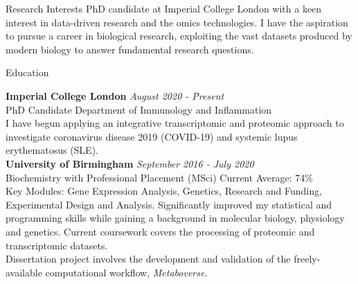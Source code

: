 \documentclass{resume}
\begin{document}
\begin{rSection}{Research Interests}
PhD candidate at Imperial College London with a keen interest in data-driven research and the omics technologies. I have the aspiration to pursue a career in biological research, exploiting the vast datasets produced by modern biology to answer fundamental research questions.

\end{rSection}
\begin{rSection}{Education}

{\bf Imperial College London} \hfill {\em August 2020 - Present} 
\\ PhD Candidate \hfill {Department of Immunology and Inflammation} \smallskip \\
I have begun applying an integrative transcriptomic and proteomic approach to investigate coronavirus disease 2019 (COVID-19) and systemic lupus erythematosus (SLE). 
\\

{\bf University of Birmingham} \hfill {\em September 2016 - July 2020} 
\\ Biochemistry with Professional Placement (MSci) \hfill {Current Average: 74\%} \smallskip \\
Key Modules: Gene Expression Analysis, Genetics, Research and Funding, Experimental Design and Analysis. Significantly improved my statistical and programming skills while gaining a background in molecular biology, physiology and genetics. Current coursework covers the processing of proteomic and transcriptomic datasets. \smallskip \\ Dissertation project involves the development and validation of the freely-available computational workflow, \textit{Metaboverse}.  \\

\end{rSection}
\end{document}
